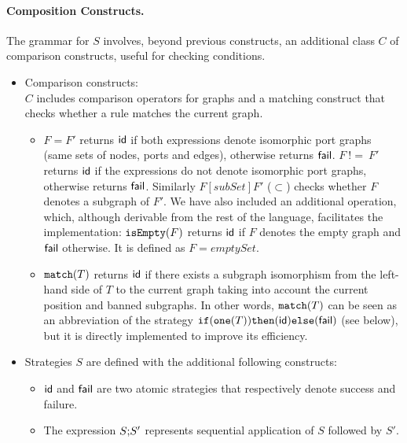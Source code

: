 \documentclass[a4paper,10pt,runningheads]{llncs}
\newcommand{\one}[1]{{\tt one(}#1{\tt )}}
\newcommand{\Id}{{\sf id}}
\newcommand{\Fail}{{\sf fail}}
\newcommand{\isEmpty}[1]{{\tt isEmpty(}#1{\tt )}}
\newcommand{\tmatch}[1]{{\tt match(}#1{\tt )}}
\newcommand{\ifthenelsee}[3]{{\tt if(}#1{\tt )then(}#2{\tt )else(}#3{\tt )}}
\begin{document}
\paragraph{\bf Composition Constructs.}

The grammar for $S$ involves, beyond previous constructs, an additional class $C$
of comparison constructs, useful for checking conditions.

\begin{itemize}
\item
Comparison constructs:\\ 
$C$ includes comparison operators for graphs
and a matching construct that checks whether a rule matches the
current graph.
\begin{itemize}
 \item 
$ F = F'$  returns $\Id$ if  
both expressions denote isomorphic port graphs (same sets of nodes, ports and edges), otherwise returns 
$\Fail$.  
$F ~  !\!\! = ~  F'$ returns $\Id$ if 
the expressions do not denote isomorphic port graphs, otherwise returns $\Fail$.
Similarly $F [subSet] F'$ ($\subset$) checks whether $F$ denotes a subgraph of
$F'$.
We have also included an additional operation, which, although derivable from the rest of the language, facilitates the implementation:
$\isEmpty{F}$ returns $\Id$ if $F$ denotes the empty graph and $\Fail$ otherwise. It is
defined as $ F = emptySet$. 

\item $\tmatch{T}$ returns $\Id$ if there exists a subgraph isomorphism
from the left-hand side of $T$ to the current graph taking into
account the current position and banned subgraphs. In other words,
$\tmatch{T}$ can be seen as an abbreviation of the strategy
$\ifthenelsee{\one{T}}{\Id}{\Fail}$ (see below), but it is directly
implemented to improve its efficiency.
\end{itemize}


\item
Strategies $S$ are  defined with the additional following
constructs:
\begin{itemize}

\item  $\Id$ and $\Fail$ are two atomic strategies that respectively denote
success and failure. 


 \item  The expression $S{\tt ;}S'$ represents sequential application of $S$ followed by $S'$.


\end{itemize}
\end{itemize}
\end{document}
